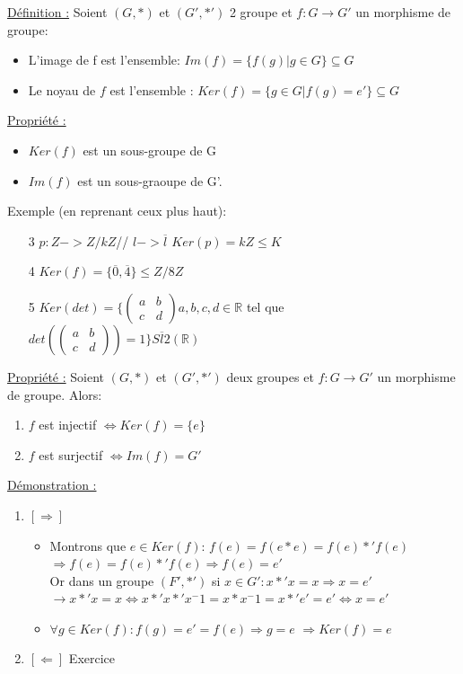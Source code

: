 \documentclass[11pt]{article}
\begin{document}
			\underline{Définition :} Soient $(G, *)$ et $(G', *')$ 2 groupe et $f:G \rightarrow G'$ un morphisme de groupe:
			\begin{itemize}
				\item L'image de f est l'ensemble: $Im(f) = \{ f(g) | g \in G\} \subseteq G$
				\item Le noyau de $f$ est l'ensemble : $Ker(f) = \{ g \in G | f(g) = e'  \} \subseteq G$
			\end{itemize}
			\underline{Propriété :} 
			\begin{itemize}
				\item $Ker(f)$ est un sous-groupe de G
				\item $Im(f)$ est un sous-graoupe de G'.
			\end{itemize}
			Exemple (en reprenant ceux plus haut): 
			\begin{itemize}
				\item[3] $p: Z -> Z/kZ$//
					$l-> \overline{l}$
					$Ker(p) = kZ \leq K$
				\item[4] $Ker(f) = \{\overline{0}, \overline{4}\} \leq Z/8Z$
				\item[5] $Ker(det) = \{
				\begin{pmatrix}
  					a & b \\
					c & d 
				\end{pmatrix}
				 a, b, c, d \in \mathbb R$ tel que $det(
				\begin{pmatrix}
  					a & b \\
					c & d 
				\end{pmatrix}) = 1\} S\overline{l}2(\mathbb R)$
			\end{itemize}
			\underline{Propriété :} Soient $(G, *)$ et $(G', *')$ deux groupes et $f: G \rightarrow G'$ un morphisme de groupe. Alors:
		 	\begin{enumerate}
				\item $f$ est injectif $\Leftrightarrow Ker(f) = \{e\}$
				\item $f$ est surjectif $\Leftrightarrow Im(f) = G'$
			\end{enumerate}
			\underline{Démonstration :}
			\begin{enumerate}
				\item $\left[ \Rightarrow \right]$
				\begin{itemize}
					\item  Montrons que $e \in Ker(f)$: $f(e) = f(e*e) = f(e) *' f(e)$\\
					$\Rightarrow f(e) = f(e) *' f(e) \Rightarrow f(e) = e'$\\
					Or dans un groupe $(F', *')$ si $x \in G': x *' x = x \Rightarrow x = e'$\\
					$\rightarrow x *' x = x \Leftrightarrow x *' x *' x^-1 = x * x^-1 = x *' e' = e' \Leftrightarrow x = e'$
					\item $\forall g \in Ker(f): f(g) = e' = f(e) \Rightarrow g = e$
					$\Rightarrow Ker(f) = {e}$
				\end{itemize}
					\item $\left[ \Leftarrow \right]$ Exercice
			\end{enumerate}
			
\end{document}
